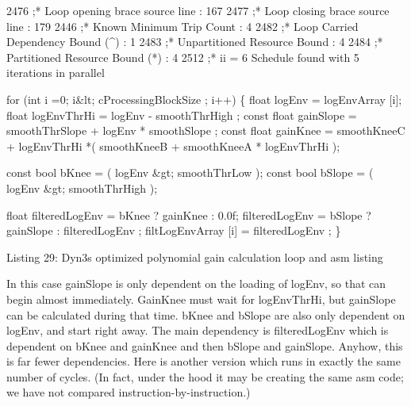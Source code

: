 \begin{DoxyCode}
2476 ;* Loop opening brace source line : 167
2477 ;* Loop closing brace source line : 179
2446 ;* Known Minimum Trip Count : 4
2482 ;* Loop Carried Dependency Bound (^) : 1
2483 ;* Unpartitioned Resource Bound : 4
2484 ;* Partitioned Resource Bound (*) : 4
2512 ;* ii = 6 Schedule found with 5 iterations in parallel

\textcolor{keywordflow}{for} (\textcolor{keywordtype}{int} i =0; i&lt; cProcessingBlockSize ; i++)
\{
    \textcolor{keywordtype}{float} logEnv = logEnvArray [i];
    \textcolor{keywordtype}{float} logEnvThrHi = logEnv - smoothThrHigh ;
    \textcolor{keyword}{const} \textcolor{keywordtype}{float} gainSlope = smoothThrSlope +
        logEnv * smoothSlope ;
    \textcolor{keyword}{const} \textcolor{keywordtype}{float} gainKnee = smoothKneeC +
        logEnvThrHi *( smoothKneeB +
        smoothKneeA * logEnvThrHi );

    \textcolor{keyword}{const} \textcolor{keywordtype}{bool} bKnee = ( logEnv &gt; smoothThrLow );
    \textcolor{keyword}{const} \textcolor{keywordtype}{bool} bSlope = ( logEnv &gt; smoothThrHigh );

    \textcolor{keywordtype}{float} filteredLogEnv = bKnee ? gainKnee : 0.0f;
    filteredLogEnv = bSlope ? gainSlope : filteredLogEnv ;
    filtLogEnvArray [i] = filteredLogEnv ;
\} 
\end{DoxyCode}
  Listing 29\+: Dyn3\textquotesingle{}s optimized polynomial gain calculation loop and asm listing

In this case {\ttfamily gain\+Slope} is only dependent on the loading of {\ttfamily log\+Env}, so that can begin almost immediately. {\ttfamily Gain\+Knee} must wait for {\ttfamily log\+Env\+Thr\+Hi}, but {\ttfamily gain\+Slope} can be calculated during that time. {\ttfamily b\+Knee} and {\ttfamily b\+Slope} are also only dependent on {\ttfamily log\+Env}, and start right away. The main dependency is {\ttfamily filtered\+Log\+Env} which is dependent on {\ttfamily b\+Knee} and {\ttfamily gain\+Knee} and then {\ttfamily b\+Slope} and {\ttfamily gain\+Slope}. Anyhow, this is far fewer dependencies. Here is another version which runs in exactly the same number of cycles. (In fact, under the hood it may be creating the same asm code; we have not compared instruction-\/by-\/instruction.)


